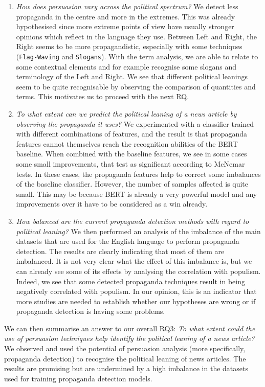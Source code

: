 \begin{enumerate}[label={\textbf{RQ3.\arabic*:}},leftmargin=2cm]
    \item \emph{How does persuasion vary across the political spectrum?} We detect less propaganda in the centre and more in the extremes. This was already hypothesised since more extreme points of view have usually stronger opinions which reflect in the language they use. Between Left and Right, the Right seems to be more propagandistic, especially with some techniques (\texttt{Flag-Waving} and \texttt{Slogans}). With the term analysis, we are able to relate to some contextual elements and for example recognise some slogans and terminology of the Left and Right. We see that different political leanings seem to be quite recognisable by observing the comparison of quantities and terms. This motivates us to proceed with the next RQ.
    \item \emph{To what extent can we predict the political leaning of a news article by observing the propaganda it uses?} We experimented with a classifier trained with different combinations of features, and the result is that propaganda features cannot themselves reach the recognition abilities of the BERT baseline. When combined with the baseline features, we see in some cases some small improvements, that test as significant according to McNemar tests. In these cases, the propaganda features help to correct some imbalances of the baseline classifier. However, the number of samples affected is quite small. This may be because BERT is already a very powerful model and any improvements over it have to be considered as a win already.
    \item \emph{How balanced are the current propaganda detection methods with regard to political leaning?} We then performed an analysis of the imbalance of the main datasets that are used for the English language to perform propaganda detection. The results are clearly indicating that most of them are imbalanced. It is not very clear what the effect of this imbalance is, but we can already see some of its effects by analysing the correlation with populism. Indeed, we see that some detected propaganda techniques result in being negatively correlated with populism. In our opinion, this is an indicator that more studies are needed to establish whether our hypotheses are wrong or if propaganda detection is having some problems.
\end{enumerate}


We can then summarise an answer to our overall RQ3: \emph{To what extent could the use of persuasion techniques help identify the political leaning of a news article?}
We observed and used the potential of persuasion analysis (more specifically, propaganda detection) to recognise the political leaning of news articles. The results are promising but are undermined by a high imbalance in the datasets used for training propaganda detection models.



